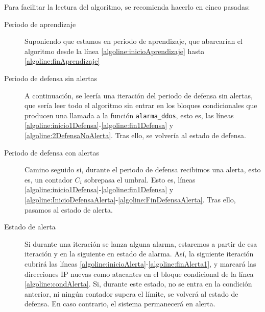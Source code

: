 Para facilitar la lectura del algoritmo, se recomienda hacerlo en cinco pasadas:

\begin{description}
 \item [Periodo de aprendizaje] Suponiendo que estamos en periodo de aprendizaje, que abarcarían el algoritmo desde la 
línea \ref{algoline:inicioAprendizaje} hasta \ref{algoline:finAprendizaje}
 \item [Periodo de defensa sin alertas] A continuación, se leería una iteración del periodo de defensa sin alertas, que 
sería leer todo el algoritmo sin entrar en los bloques condicionales que producen una llamada a la función 
\texttt{alarma\_ddos}, esto es, las líneas \ref{algoline:inicio1Defensa}-\ref{algoline:fin1Defensa} y 
\ref{algoline:2DefensaNoAlerta}. Tras ello, se volvería al estado de defensa.
 \item[Periodo de defensa con alertas] Camino seguido si, durante el periodo de defensa recibimos una alerta, esto es, 
un contador $C_i$ sobrepasa el umbral. Esto es, líneas \ref{algoline:inicio1Defensa}-\ref{algoline:fin1Defensa} y 
\ref{algoline:InicioDefensaAlerta}-\ref{algoline:FinDefensaAlerta}. Tras ello, pasamos al estado de alerta.
 \item[Estado de alerta] Si durante una iteración se lanza alguna alarma, estaremos a partir de esa 
iteración y en la siguiente en estado de alarma. Así, la siguiente iteración cubrirá las líneas 
\ref{algoline:inicioAlerta}-\ref{algoline:finAlerta1}, y marcará las direcciones IP nuevas como atacantes en el bloque 
condicional de la línea \ref{algoline:condAlerta}. Si, durante este estado, no se entra en la condición anterior, ni 
ningún contador supera el límite, se volverá al estado de defensa. En caso contrario, el sistema permanecerá en alerta.
\end{description}

